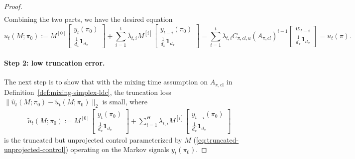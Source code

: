 \begin{proof}
\begin{align*}
\end{align*}
Combining the two parts, we have the desired equation
$$
\hat{u}_t(M;\pi_0):=M^{[0]}\begin{bmatrix}
    y_t(\pi_0) \\
    \frac{1}{d_x}\mathbf{1}_{d_x}
\end{bmatrix} +\sum_{i=1}^t\bar{\lambda}_{t,i}M^{[i]}\begin{bmatrix}
    y_{t-i}(\pi_0) \\
    \frac{1}{d_x}\mathbf{1}_{d_x}
\end{bmatrix} = \sum_{i=1}^t \lambda_{t,i} C_{\pi,cl,u} (A_{\pi,cl})^{i-1} \begin{bmatrix}
    w_{t-i} \\
    \frac{1}{d_x}\mathbf{1}_{d_x}
\end{bmatrix} =u_t(\pi).
$$

\paragraph{Step 2: low truncation error.}
The next step is to show that with the mixing time assumption on $A_{\pi,\mathrm{cl}}$ in Definition~\ref{def:mixing-simplex-ldc}, the truncation loss $\|\hat{u}_t(M;\pi_0)-\tilde{u}_t(M;\pi_0)\|_2$ is small, where
\begin{align*}
\tilde{u}_t(M;\pi_0):=M^{[0]}\begin{bmatrix}
    y_t(\pi_0) \\
    \frac{1}{d_x}\mathbf{1}_{d_x}
\end{bmatrix} +\sum_{i=1}^H\bar{\lambda}_{t,i}M^{[i]}\begin{bmatrix}
    y_{t-i}(\pi_0) \\
    \frac{1}{d_x}\mathbf{1}_{d_x}
\end{bmatrix} 
\end{align*}
is the truncated but unprojected control parameterized by $M$ (\cref{eq:truncated-unprojected-control}) operating on the Markov signals $y_t(\pi_0)$.


\end{proof}
